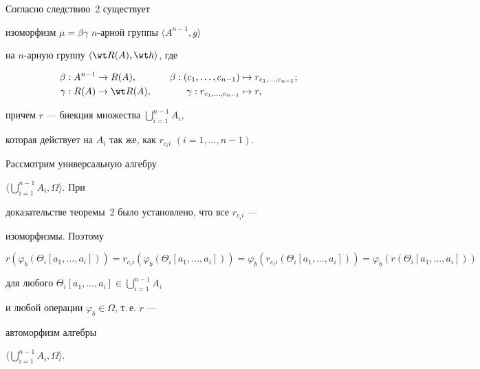\begin{pf}


Согласно следствию~2 существует


изоморфизм $\mu =\beta\gamma$ $n$-арной группы $\langle A^{n-1}, g \rangle$


на $n$-арную группу $\langle \wt R(A),\wt h\rangle$, где


\begin{alignat*}{2}


\beta: A^{n-1} &\to R(A),&\quad \beta: (c_1,\dotsc,c_{n-1})&\mapsto


r_{c_1,\dotsc,c_{n-1}}; \\


%


\gamma: R(A)&\to\wt R(A), &\quad


\gamma:r_{c_1,\dotsc,c_{n-1}}&\mapsto r,


\end{alignat*}


причем $r$ --- биекция множества $\bigcup\limits_{i=1}^{n-1}A_i$,


которая действует на $A_i$ так же, как $r_{c_ii}$ $(i=1,\dotsc, n-1)$.





Рассмотрим универсальную алгебру


$\Big\langle \bigcup\limits_{i=1}^{n-1}A_i,\Omega\Big\rangle $. При


доказательстве теоремы~2 было установлено, что все $r_{c_ii}$ ---


изоморфизмы. Поэтому


$$


r(\varphi_b (\Theta_i[a_1,\dotsc, a_i])) =


r_{c_ii}(\varphi_b (\Theta_i[a_1,\dotsc, a_i])) =


\varphi_b(r_{c_ii}(\Theta_i[a_1,\dotsc, a_i])) =


\varphi_b (r(\Theta_i[a_1,\dotsc, a_i]))


$$


для любого $\Theta_i[a_1,\dotsc, a_i]\in \bigcup\limits_{i=1}^{n-1}A_i$


и любой операции $\varphi_b\in \Omega$, т.\,е. $r$ ---


автоморфизм алгебры


$\Big\langle \bigcup\limits_{i=1}^{n-1}A_i,\Omega\Big\rangle$.


\end{pf}





